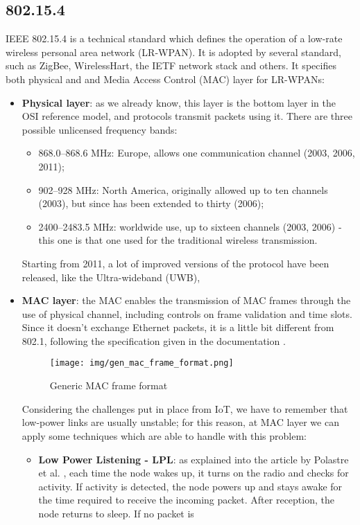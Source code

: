 \documentclass[sigconf]{acmart}
\begin{document}
    \subsection{802.15.4}
    IEEE 802.15.4 is a technical standard which defines the operation of a low-rate wireless personal area network (LR-WPAN). It is adopted by several standard, such as ZigBee, WirelessHart, the IETF network stack and others. It specifies both physical and  and Media Access Control (MAC) layer for LR-WPANs:
    \begin{itemize}
    \item \textbf{Physical layer}: as we already know, this layer is the bottom layer in the OSI reference model, and protocols transmit packets using it. There are three possible unlicensed frequency bands:
    \begin{itemize}
    \item 868.0–868.6 MHz: Europe, allows one communication channel (2003, 2006, 2011);
    \item 902–928 MHz: North America, originally allowed up to ten channels (2003), but since has been extended to thirty (2006);
    \item 2400–2483.5 MHz: worldwide use, up to sixteen channels (2003, 2006) - this one is that one used for the traditional wireless transmission.
    \end{itemize}
    Starting from 2011, a lot of improved versions of the protocol have been released, like the Ultra-wideband (UWB), 
    \item \textbf{MAC layer}: the MAC enables the transmission of MAC frames through the use of physical channel, including controls on frame validation and time slots. Since it doesn't exchange Ethernet packets, it is a little bit different from 802.1, following the specification given in the documentation \cite{802_15_4}.
    \begin{figure}[h!]
        \texttt{[image: img/gen\_mac\_frame\_format.png]}
        \caption{Generic MAC frame format}
        \label{fig:gen_mac_frame_format}
    \end{figure}
    Considering the challenges put in place from IoT, we have to remember that low-power links are usually unstable; for this reason, at MAC layer we can apply some techniques which are able to handle with this problem:
    \begin{itemize}
    \item \textbf{Low Power Listening - LPL}: as explained into the article by Polastre et al. \cite{polastre}, each time the node wakes up, it turns on the radio and checks for activity. If activity is detected, the node powers up and stays awake for the time required to receive the incoming packet. After reception, the node returns to sleep. If no packet is

\end{itemize}
\end{itemize}
\end{document}
